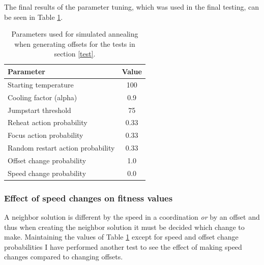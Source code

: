 The final results of the parameter tuning, which was used in the final testing, can be seen in Table \ref{tab:saparms}.

\begin{table}[htbp]
\centering
\begin{tabular}{l|c}
\textbf{Parameter} & \textbf{Value}\\ \hline
Starting temperature & 100 \\
Cooling factor (alpha) & 0.9 \\ 
Jumpstart threshold & 75 \\
Reheat action probability & 0.33 \\
Focus action probability & 0.33 \\
Random restart action probability & 0.33 \\
Offset change probability & 1.0 \\
Speed change probability & 0.0
\end{tabular}
\caption{Parameters used for simulated annealing when generating offsets for the tests in section \ref{test}.}
\label{tab:saparms}
\end{table}

\subsubsection*{Effect of speed changes on fitness values}
A neighbor solution is different by the speed in a coordination \textit{or} by an offset and thus when creating the neighbor solution it must be decided which change to make.
Maintaining the values of Table \ref{tab:saparms} except for speed and offset change probabilities I have performed another test to see the effect of making speed changes compared to changing offsets.

